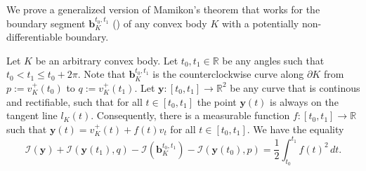 We prove a generalized version of Mamikon’s theorem \autocite{mnatsakanianAnnularRingsEqual1997} that works for the boundary segment \(\mathbf{b}_K^{t_0, t_1}\) () of any convex body \(K\) with a potentially non-differentiable boundary.

\begin{theorem}

Let \(K\) be an arbitrary convex body. Let \(t_0, t_1 \in \mathbb{R}\) be any angles such that \(t_0 < t_1 \leq t_0 + 2 \pi\). Note that \(\mathbf{b}_K^{t_0, t_1}\) is the counterclockwise curve along \(\partial K\) from \(p := v_K^+(t_0)\) to \(q := v_K^+(t_1)\). Let \(\mathbf{y} : [t_0, t_1] \to \mathbb{R}^2\) be any curve that is continous and rectifiable, such that for all \(t \in [t_0, t_1]\) the point \(\mathbf{y}(t)\) is always on the tangent line \(l_K(t)\). Consequently, there is a measurable function \(f : [t_0, t_1] \to \mathbb{R}\) such that \(\mathbf{y}(t) = v_K^+(t) + f(t)v_t\) for all \(t \in [t_0, t_1]\). We have the equality
\[
\mathcal{I}(\mathbf{y}) + \mathcal{I}\left( \mathbf{y}(t_1), q \right) - \mathcal{I}\left( \mathbf{b}_K^{t_0, t_1} \right)  - \mathcal{I}\left( \mathbf{y}(t_0), p \right) =  \frac{1}{2}\int_{t_0}^{t_1} f(t) ^2 \, dt.
\]

\label{thm:mamikon}
\end{theorem}

